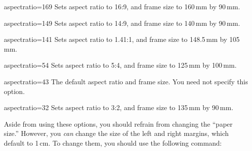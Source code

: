 \begin{classoption}{aspectratio=169}
  Sets aspect ratio to 16:9, and frame size to 160\,mm by 90\,mm.
\end{classoption}

\begin{classoption}{aspectratio=149}
  Sets aspect ratio to 14:9, and frame size to 140\,mm by 90\,mm.
\end{classoption}

\begin{classoption}{aspectratio=141}
  Sets aspect ratio to 1.41:1, and frame size to 148.5\,mm by 105\,mm.
\end{classoption}

\begin{classoption}{aspectratio=54}
  Sets aspect ratio to 5:4, and frame size to 125\,mm by 100\,mm.
\end{classoption}

\begin{classoption}{aspectratio=43}
  The default aspect ratio and frame size. You need not specify this option.
\end{classoption}

\begin{classoption}{aspectratio=32}
  Sets aspect ratio to 3:2, and frame size to 135\,mm by 90\,mm.
\end{classoption}

Aside from using these options, you should refrain from changing the ``paper size.'' However, you \emph{can} change the size of the left and right margins, which default to 1\,cm. To change them, you should use the following command:

